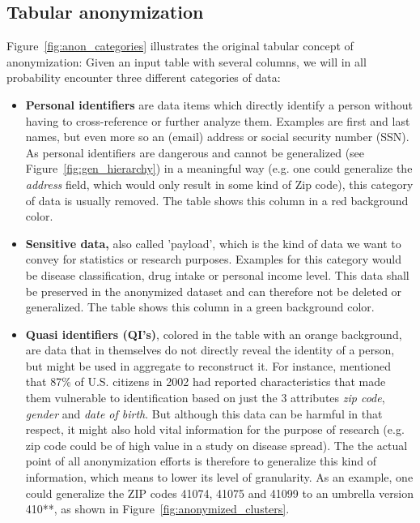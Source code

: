 \documentclass{llncs}
\begin{document}
\subsection{Tabular anonymization}
\label{ssect:tab_anonym}

Figure~\ref{fig:anon_categories} illustrates the original tabular concept of anonymization: Given an input table with several columns, we will in all probability encounter three different categories of data:

\begin{itemize}
	\item \textbf{Personal identifiers} are data items which directly identify a person without having to cross-reference or further analyze them. Examples are first and last names, but even more so an (email) address or social security number (SSN). As personal identifiers are dangerous and cannot be generalized (see Figure~\ref{fig:gen_hierarchy}) in a meaningful way (e.g. one could generalize the \textit{address} field, which would only result in some kind of Zip code), this category of data is usually removed. The table shows this column in a red background color.
	\item \textbf{Sensitive data,} also called 'payload', which is the kind of data we want to convey for statistics or research purposes. Examples for this category would be disease classification, drug intake or personal income level. This data shall be preserved in the anonymized dataset and can therefore not be deleted or generalized. The table shows this column in a green background color.
	\item \textbf{Quasi identifiers (QI's)}, colored in the table with an orange background, are data that in themselves do not directly reveal the identity of a person, but might be used in aggregate to reconstruct it. For instance, \cite{sweeney2002k} mentioned that 87\% of U.S. citizens in 2002 had reported characteristics that made them vulnerable to identification based on just the 3 attributes \textit{zip code}, \textit{gender} and \textit{date of birth}. But although this data can be harmful in that respect, it might also hold vital information for the purpose of research (e.g. zip code could be of high value in a study on disease spread). The the actual point of all anonymization efforts is therefore to generalize this kind of information, which means to lower its level of granularity. As an example, one could generalize the ZIP codes 41074, 41075 and 41099 to an umbrella version 410**, as shown in Figure~\ref{fig:anonymized_clusters}.
\end{itemize}
\end{document}
